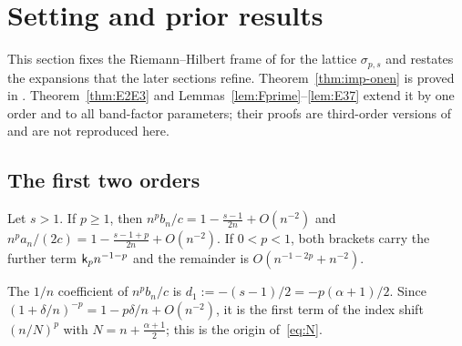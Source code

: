 \section{Setting and prior results}\label{sec:prior}

This section fixes the Riemann--Hilbert frame of \cite{PaperII} for the lattice $\sigma_{p,s}$ and restates the
expansions that the later sections refine. Theorem~\ref{thm:imp-onen} is proved in \cite{PaperII}.
Theorem~\ref{thm:E2E3} and Lemmas~\ref{lem:Fprime}--\ref{lem:E37} extend it by one order and to all band-factor
parameters; their proofs are third-order versions of \cite[Sections~8--10]{PaperII} and are not reproduced here.

\subsection{The first two orders}\label{sec:imp}
\begin{theorem}\label{thm:imp-onen}
Let $s>1$. If $p\ge1$, then $n^pb_n/c=1-\frac{s-1}{2n}+O(n^{-2})$ and $n^pa_n/(2c)=1-\frac{s-1+p}{2n}+O(n^{-2})$. If
$0<p<1$, both brackets carry the further term $\mathsf k_p n^{-1-p}$ and the remainder is $O(n^{-1-2p}+n^{-2})$.
\end{theorem}

The $1/n$ coefficient of $n^pb_n/c$ is $d_1:=-(s-1)/2=-p(\alpha+1)/2$. Since $(1+\delta/n)^{-p}=1-p\delta/n+O(n^{-2})$,
it is the first term of the index shift $(n/N)^p$ with $N=n+\frac{\alpha+1}2$; this is the origin of~\eqref{eq:N}.

